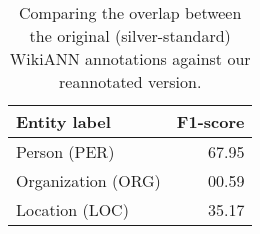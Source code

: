 \documentclass[../report.tex]{subfiles}
\begin{document}
\begin{table}[t]
\centering
{
\begin{tabular}{@{}lr@{}}
\toprule
Entity label       & F1-score  \\ \midrule
Person (PER)       & 67.95     \\
Organization (ORG) & 00.59     \\
Location (LOC)     & 35.17     \\
\bottomrule
\end{tabular}

}
\caption{
    Comparing the overlap between the original (silver-standard) WikiANN annotations against our reannotated version.
}
\label{table:results_gold}
\end{table}
\end{document}

